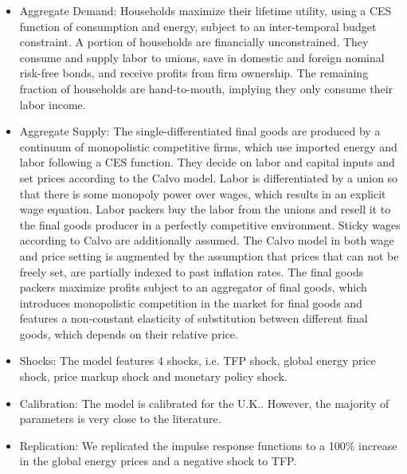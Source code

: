 \documentclass[11pt,a4paper]{article}
\begin{document}
 	\begin{itemize}
 	\item Aggregate Demand: Households maximize their lifetime utility, using a CES function of	consumption and energy, subject to an inter-temporal budget constraint. A portion of households are financially unconstrained. They consume and supply labor to unions, save in domestic and foreign nominal risk-free bonds, and receive profits from firm ownership. The remaining fraction of households are hand-to-mouth, implying they only consume their labor income.
	
	\item Aggregate Supply: The single-differentiated final goods are produced by a continuum of monopolistic competitive firms, which use imported energy and labor following a CES function. They decide on labor and capital inputs and set prices according to the Calvo model. Labor is differentiated by a union so that there is some monopoly power over wages, which results in an explicit wage equation. Labor packers buy the labor from the unions and resell it to the final goods producer in a perfectly competitive environment. Sticky wages according to Calvo are additionally assumed. The Calvo model in both wage and price setting is augmented by the assumption that prices that can not be freely set, are partially indexed to past inflation rates. The final goods packers maximize profits subject to an aggregator of final goods, which introduces monopolistic competition in the market for final goods and features a non-constant elasticity of substitution between different final goods, which depends on their relative price.
	
	\item Shocks: The model features 4 shocks, i.e. TFP shock, global energy price shock, price markup shock and monetary policy shock.
	
	\item Calibration: The model is calibrated for the U.K.. However, the majority of parameters is very close to the literature.
	
	\item Replication: We replicated the impulse response functions to a 100\% increase in the global energy prices and a negative shock to TFP.
	\end{itemize}
	
\end{document}
